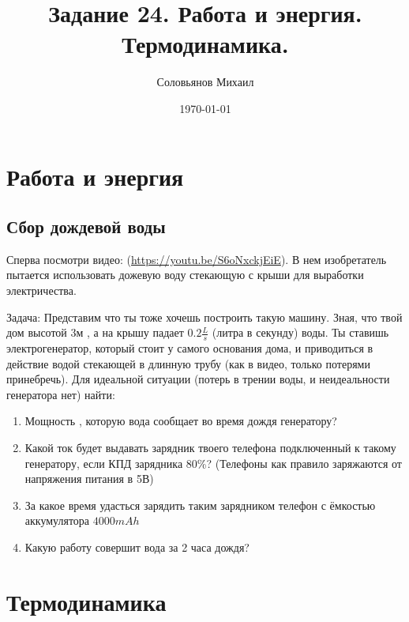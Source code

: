 \documentclass[a4paper,12pt]{article} %
\author{Соловьянов Михаил }
\title{Задание 24. Работа и энергия.  Термодинамика.}
\date{\today}
\begin{document}
\maketitle

\section{Работа и энергия}

\subsection{Сбор дождевой воды}

Сперва посмотри видео: (\url{https://youtu.be/S6oNxckjEiE}). В нем изобретатель пытается использовать дожевую воду стекающую с крыши для выработки электричества.

Задача: Представим что ты тоже хочешь построить такую машину. Зная, что твой дом высотой $ 3 $м , а на крышу падает $ 0.2 \frac{L}{s} $ (литра в секунду) воды. Ты ставишь электрогенератор, который стоит у самого основания дома, и приводиться в действие водой стекающей в длинную трубу (как в видео, только потерями принебречь). Для идеальной ситуации (потерь в трении воды, и неидеальности генератора нет) найти:

\begin{enumerate}
	\item Мощность , которую вода сообщает во время дождя генератору?
	\item Какой ток будет выдавать зарядник твоего телефона подключенный к такому генератору, если КПД зарядника 80\%? (Телефоны как правило заряжаются от напряжения питания в 5В)
	\item За какое время удасться зарядить таким зарядником телефон с ёмкостью аккумулятора $ 4000 mAh $
	\item Какую работу совершит вода за 2 часа дождя?
\end{enumerate} 


\section{Термодинамика}

\subsection{}
\end{document}
